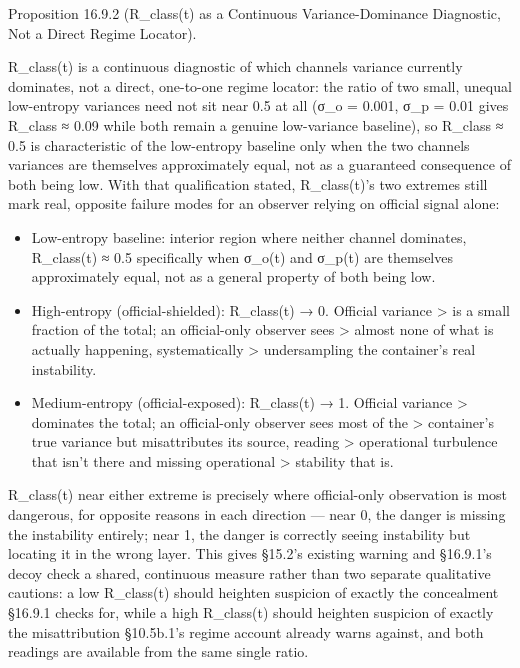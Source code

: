 \documentclass[
]{article}
\begin{document}
Proposition 16.9.2 (R\_class(t) as a Continuous Variance-Dominance
Diagnostic, Not a Direct Regime Locator).

R\_class(t) is a continuous diagnostic of which channels variance
currently dominates, not a direct, one-to-one regime locator: the ratio
of two small, unequal low-entropy variances need not sit near 0.5 at all
(σ\_o = 0.001, σ\_p = 0.01 gives R\_class ≈ 0.09 while both remain a
genuine low-variance baseline), so R\_class ≈ 0.5 is characteristic of
the low-entropy baseline only when the two channels variances are
themselves approximately equal, not as a guaranteed consequence of both
being low. With that qualification stated, R\_class(t)'s two extremes
still mark real, opposite failure modes for an observer relying on
official signal alone:

\begin{itemize}
\item
  Low-entropy baseline: interior region where neither channel dominates,
  R\_class(t) ≈ 0.5 specifically when σ\_o(t) and σ\_p(t) are themselves
  approximately equal, not as a general property of both being low.
\item
  High-entropy (official-shielded): R\_class(t) → 0. Official variance
  \textgreater{} is a small fraction of the total; an official-only
  observer sees \textgreater{} almost none of what is actually
  happening, systematically \textgreater{} undersampling the container's
  real instability.
\item
  Medium-entropy (official-exposed): R\_class(t) → 1. Official variance
  \textgreater{} dominates the total; an official-only observer sees
  most of the \textgreater{} container's true variance but misattributes
  its source, reading \textgreater{} operational turbulence that isn't
  there and missing operational \textgreater{} stability that is.
\end{itemize}

R\_class(t) near either extreme is precisely where official-only
observation is most dangerous, for opposite reasons in each direction
--- near 0, the danger is missing the instability entirely; near 1, the
danger is correctly seeing instability but locating it in the wrong
layer. This gives §15.2's existing warning and §16.9.1's decoy check a
shared, continuous measure rather than two separate qualitative
cautions: a low R\_class(t) should heighten suspicion of exactly the
concealment §16.9.1 checks for, while a high R\_class(t) should heighten
suspicion of exactly the misattribution §10.5b.1's regime account
already warns against, and both readings are available from the same
single ratio.
\end{document}
